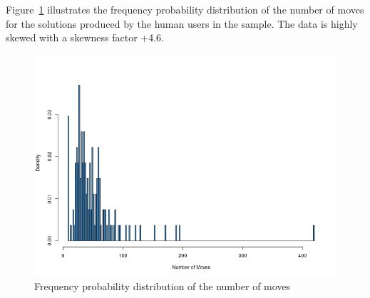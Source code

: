 Figure~\ref{fig:histvid} illustrates the frequency probability distribution of the number of moves for the solutions produced by the human users in the sample. 
The data is highly skewed with a skewness factor +4.6.
\begin{figure}[tpb]
  \centering
\includegraphics[width=0.8\columnwidth]{img/histo_video.png}
  \caption{Frequency probability distribution of the number of moves}
  \label{fig:histvid}
\end{figure}
%
